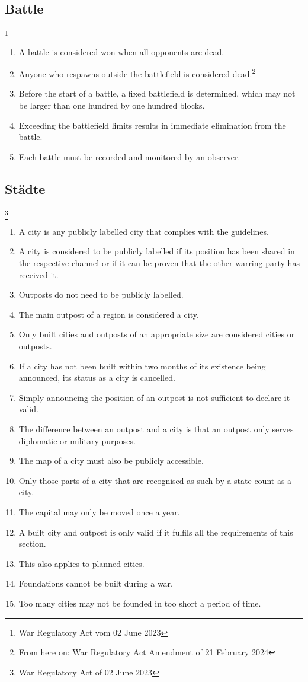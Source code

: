 \documentclass{article}
\begin{document}
\subsection{Battle}\footnote{War Regulatory Act vom 02 June 2023}
\begin{enumerate}[(1)]
	\item A battle is considered won when all opponents are dead.
	\item Anyone who respawns outside the battlefield is considered dead.\footnote{From here on: War Regulatory Act Amendment of 21 February 2024}
	\item Before the start of a battle, a fixed battlefield is determined, which may not be larger than one hundred by one hundred blocks.
	\item Exceeding the battlefield limits results in immediate elimination from the battle.
	\item Each battle must be recorded and monitored by an observer.
\end{enumerate}

\subsection{Städte}\footnote{War Regulatory Act of 02 June 2023}
\begin{enumerate}[(1)]
	\item A city is any publicly labelled city that complies with the guidelines.
	\item A city is considered to be publicly labelled if its position has been shared in the respective channel or if it can be proven that the other warring party has received it.
	\item Outposts do not need to be publicly labelled.
	\item The main outpost of a region is considered a city.
	\item Only built cities and outposts of an appropriate size are considered cities or outposts.
	\item If a city has not been built within two months of its existence being announced, its status as a city is cancelled.
	\item Simply announcing the position of an outpost is not sufficient to declare it valid.
	\item The difference between an outpost and a city is that an outpost only serves diplomatic or military purposes.
	\item The map of a city must also be publicly accessible.
	\item Only those parts of a city that are recognised as such by a state count as a city.
	\item The capital may only be moved once a year.
	\item A built city and outpost is only valid if it fulfils all the requirements of this section.
	\item This also applies to planned cities.
	\item Foundations cannot be built during a war.
	\item Too many cities may not be founded in too short a period of time.
\end{enumerate}
\end{document}
